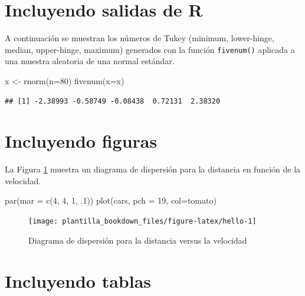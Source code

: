 \documentclass[
]{krantz}
\makeatletter
\newenvironment{Shaded}{\begin{snugshade}}{\end{snugshade}}
\newcommand{\AttributeTok}[1]{\textcolor[rgb]{0.61,0.61,0.61}{#1}}
\newcommand{\DecValTok}[1]{\textcolor[rgb]{0.06,0.06,0.06}{#1}}
\newcommand{\FunctionTok}[1]{\textcolor[rgb]{0,0,0}{#1}}
\newcommand{\NormalTok}[1]{#1}
\newcommand{\OtherTok}[1]{\textcolor[rgb]{0.37,0.37,0.37}{#1}}
\newcommand{\StringTok}[1]{\textcolor[rgb]{0.5,0.5,0.5}{#1}}
\newenvironment{kframe}{%
\medskip{}
\setlength{\fboxsep}{.8em}
 \def\at@end@of@kframe{}%
 \ifinner\ifhmode%
  \def\at@end@of@kframe{\end{minipage}}%
  \begin{minipage}{\columnwidth}%
 \fi\fi%
 \def\FrameCommand##1{\hskip\@totalleftmargin \hskip-\fboxsep
 \colorbox{shadecolor}{##1}\hskip-\fboxsep
     \hskip-\linewidth \hskip-\@totalleftmargin \hskip\columnwidth}%
 \MakeFramed {\advance\hsize-\width
   \@totalleftmargin\z@ \linewidth\hsize
   \@setminipage}}%
 {\par\unskip\endMakeFramed%
 \at@end@of@kframe}
\renewenvironment{Shaded}{\begin{kframe}}{\end{kframe}}
\makeatother
\begin{document}
\hypertarget{incluyendo-salidas-de-r}{%
\section{Incluyendo salidas de R}\label{incluyendo-salidas-de-r}}

A continuación se muestran los números de Tukey (minimum, lower-hinge, median, upper-hinge, maximum) generados con la función \texttt{fivenum()} aplicada a una muestra aleatoria de una normal estándar.

\begin{Shaded}
\begin{Highlighting}[]
\NormalTok{x }\OtherTok{\textless{}{-}} \FunctionTok{rnorm}\NormalTok{(}\AttributeTok{n=}\DecValTok{80}\NormalTok{)}
\FunctionTok{fivenum}\NormalTok{(}\AttributeTok{x=}\NormalTok{x)}
\end{Highlighting}
\end{Shaded}

\begin{verbatim}
## [1] -2.38993 -0.58749 -0.08438  0.72131  2.38320
\end{verbatim}

\hypertarget{incluyendo-figuras}{%
\section{Incluyendo figuras}\label{incluyendo-figuras}}

La Figura \ref{fig:hello} muestra un diagrama de dispersión para la distancia en función de la velocidad.

\begin{Shaded}
\begin{Highlighting}[]
\FunctionTok{par}\NormalTok{(}\AttributeTok{mar =} \FunctionTok{c}\NormalTok{(}\DecValTok{4}\NormalTok{, }\DecValTok{4}\NormalTok{, }\DecValTok{1}\NormalTok{, .}\DecValTok{1}\NormalTok{))}
\FunctionTok{plot}\NormalTok{(cars, }\AttributeTok{pch =} \DecValTok{19}\NormalTok{, }\AttributeTok{col=}\StringTok{\textquotesingle{}tomato\textquotesingle{}}\NormalTok{)}
\end{Highlighting}
\end{Shaded}

\begin{figure}
\texttt{[image: plantilla\_bookdown\_files/figure-latex/hello-1]} \caption{Diagrama de dispersión para la distancia versus la velocidad}\label{fig:hello}
\end{figure}

\hypertarget{incluyendo-tablas}{%
\section{Incluyendo tablas}\label{incluyendo-tablas}}
\end{document}
